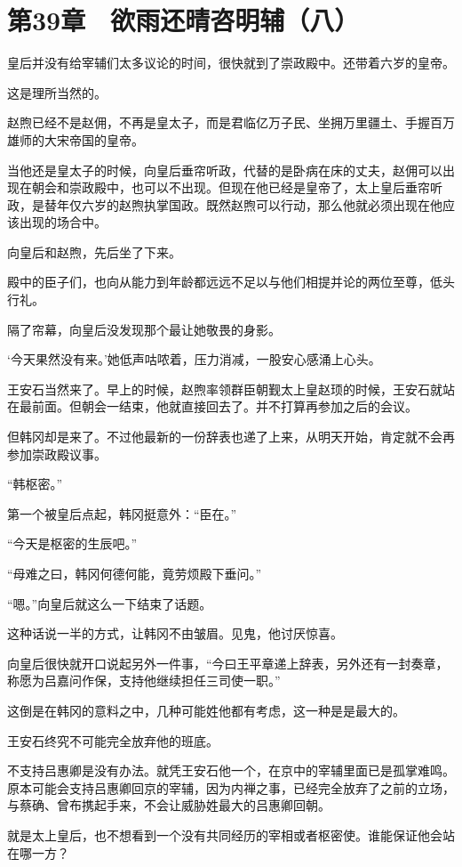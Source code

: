 \section{第39章　欲雨还晴咨明辅（八）}

皇后并没有给宰辅们太多议论的时间，很快就到了崇政殿中。还带着六岁的皇帝。

这是理所当然的。

赵煦已经不是赵佣，不再是皇太子，而是君临亿万子民、坐拥万里疆土、手握百万雄师的大宋帝国的皇帝。

当他还是皇太子的时候，向皇后垂帘听政，代替的是卧病在床的丈夫，赵佣可以出现在朝会和崇政殿中，也可以不出现。但现在他已经是皇帝了，太上皇后垂帘听政，是替年仅六岁的赵煦执掌国政。既然赵煦可以行动，那么他就必须出现在他应该出现的场合中。

向皇后和赵煦，先后坐了下来。

殿中的臣子们，也向从能力到年龄都远远不足以与他们相提并论的两位至尊，低头行礼。

隔了帘幕，向皇后没发现那个最让她敬畏的身影。

‘今天果然没有来。’她低声咕哝着，压力消减，一股安心感涌上心头。

王安石当然来了。早上的时候，赵煦率领群臣朝觐太上皇赵顼的时候，王安石就站在最前面。但朝会一结束，他就直接回去了。并不打算再参加之后的会议。

但韩冈却是来了。不过他最新的一份辞表也递了上来，从明天开始，肯定就不会再参加崇政殿议事。

“韩枢密。”

第一个被皇后点起，韩冈挺意外：“臣在。”

“今天是枢密的生辰吧。”

“母难之曰，韩冈何德何能，竟劳烦殿下垂问。”

“嗯。”向皇后就这么一下结束了话题。

这种话说一半的方式，让韩冈不由皱眉。见鬼，他讨厌惊喜。

向皇后很快就开口说起另外一件事，“今曰王平章递上辞表，另外还有一封奏章，称愿为吕嘉问作保，支持他继续担任三司使一职。”

这倒是在韩冈的意料之中，几种可能姓他都有考虑，这一种是是最大的。

王安石终究不可能完全放弃他的班底。

不支持吕惠卿是没有办法。就凭王安石他一个，在京中的宰辅里面已是孤掌难鸣。原本可能会支持吕惠卿回京的宰辅，因为内禅之事，已经完全放弃了之前的立场，与蔡确、曾布携起手来，不会让威胁姓最大的吕惠卿回朝。

就是太上皇后，也不想看到一个没有共同经历的宰相或者枢密使。谁能保证他会站在哪一方？

